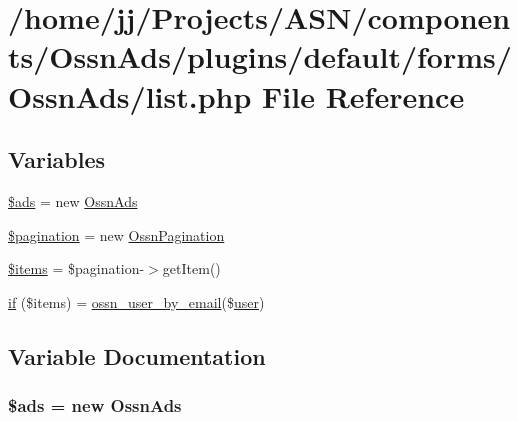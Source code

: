 \hypertarget{components_2_ossn_ads_2plugins_2default_2forms_2_ossn_ads_2list_8php}{}\section{/home/jj/\+Projects/\+A\+S\+N/components/\+Ossn\+Ads/plugins/default/forms/\+Ossn\+Ads/list.php File Reference}
\label{components_2_ossn_ads_2plugins_2default_2forms_2_ossn_ads_2list_8php}
\subsection*{Variables}
\begin{DoxyCompactItemize}
\item 
\hyperlink{components_2_ossn_ads_2plugins_2default_2forms_2_ossn_ads_2list_8php_ad17d05c95f26062b26aadac5d2abbc73}{\$ads} = new \hyperlink{class_ossn_ads}{Ossn\+Ads}
\item 
\hyperlink{components_2_ossn_ads_2plugins_2default_2forms_2_ossn_ads_2list_8php_a388a4a950e936f746d3b9c1b56450ce7}{\$pagination} = new \hyperlink{class_ossn_pagination}{Ossn\+Pagination}
\item 
\hyperlink{components_2_ossn_ads_2plugins_2default_2forms_2_ossn_ads_2list_8php_a737abdef83dabb219182c1e88887c6c3}{\$items} = \$pagination-\/$>$get\+Item()
\item 
\hyperlink{components_2_ossn_ads_2plugins_2default_2forms_2_ossn_ads_2list_8php_ab23e189486260f99f18ca7ff058738c1}{if} (\$items) = \hyperlink{ossn_8lib_8users_8php_a94038a27190428af074339ac9b243445}{ossn\+\_\+user\+\_\+by\+\_\+email}(\$\hyperlink{ossn_8config_8db_8example_8php_a802544b7ba9f79bbf24ef67773d53bed}{user})
\end{DoxyCompactItemize}


\subsection{Variable Documentation}
\subsubsection[{\texorpdfstring{\$ads}{$ads}}]{\setlength{\rightskip}{0pt plus 5cm}\$ads = new {\bf Ossn\+Ads}}\hypertarget{components_2_ossn_ads_2plugins_2default_2forms_2_ossn_ads_2list_8php_ad17d05c95f26062b26aadac5d2abbc73}{}\label{components_2_ossn_ads_2plugins_2default_2forms_2_ossn_ads_2list_8php_ad17d05c95f26062b26aadac5d2abbc73}


